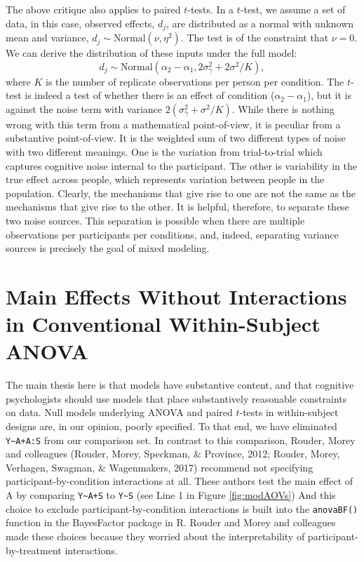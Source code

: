 \documentclass[
  english,
  ,man]{apa6}
\begin{document}
The above critique also applies to paired \(t\)-tests. In a \(t\)-test, we assume a set of data, in this case, observed effects, \(d_j\), are distributed as a normal with unknown mean and variance, \(d_j \sim \mbox{Normal}(\nu,\eta^2)\). The test is of the constraint that \(\nu=0\). We can derive the distribution of these inputs under the full model:
\[
d_j \sim \mbox{Normal}(\alpha_2-\alpha_1,2\sigma^2_\gamma+2\sigma^2/K),
\]
where \(K\) is the number of replicate observations per person per condition. The \(t\)-test is indeed a test of whether there is an effect of condition (\(\alpha_2-\alpha_1\)), but it is against the noise term with variance \(2(\sigma^2_\gamma+\sigma^2/K)\). While there is nothing wrong with this term from a mathematical point-of-view, it is peculiar from a substantive point-of-view. It is the weighted sum of two different types of noise with two different meanings. One is the variation from trial-to-trial which captures cognitive noise internal to the participant. The other is variability in the true effect across people, which represents variation between people in the population. Clearly, the mechanisms that give rise to one are not the same as the mechanisms that give rise to the other. It is helpful, therefore, to separate these two noise sources. This separation is possible when there are multiple observations per participants per conditions, and, indeed, separating variance sources is precisely the goal of mixed modeling.

\hypertarget{main-effects-without-interactions-in-conventional-within-subject-anova}{%
\section{Main Effects Without Interactions in Conventional Within-Subject ANOVA}\label{main-effects-without-interactions-in-conventional-within-subject-anova}}

The main thesis here is that models have substantive content, and that cognitive psychologists should use models that place substantively reasonable constraints on data. Null models underlying ANOVA and paired \(t\)-tests in within-subject designs are, in our opinion, poorly specified. To that end, we have eliminated \texttt{Y\textasciitilde{}A+A:S} from our comparison set. In contrast to this comparison, Rouder, Morey and colleagues (Rouder, Morey, Speckman, \& Province, 2012; Rouder, Morey, Verhagen, Swagman, \& Wagenmakers, 2017) recommend not specifying participant-by-condition interactions at all. These authors test the main effect of A by comparing \texttt{Y\textasciitilde{}A+S} to \texttt{Y\textasciitilde{}S} (see Line 1 in Figure \ref{fig:modAOVs}) And this choice to exclude participant-by-condition interactions is built into the \texttt{anovaBF()} function in the BayesFactor package in R. Rouder and Morey and colleagues made these choices because they worried about the interpretability of participant-by-treatment interactions.
\end{document}
